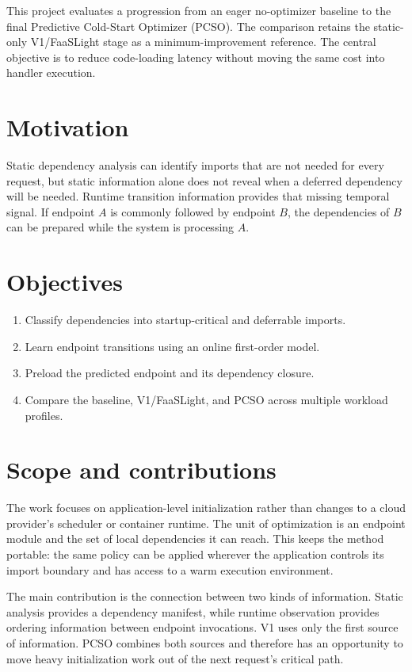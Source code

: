 \documentclass[12pt]{report}
\begin{document}
This project evaluates a progression from an eager no-optimizer baseline to the final Predictive Cold-Start Optimizer (PCSO). The comparison retains the static-only V1/FaaSLight stage as a minimum-improvement reference. The central objective is to reduce code-loading latency without moving the same cost into handler execution.

\section{Motivation}
Static dependency analysis can identify imports that are not needed for every request, but static information alone does not reveal when a deferred dependency will be needed. Runtime transition information provides that missing temporal signal. If endpoint $A$ is commonly followed by endpoint $B$, the dependencies of $B$ can be prepared while the system is processing $A$.

\section{Objectives}
\begin{enumerate}[label={(\arabic*)}]
\item Classify dependencies into startup-critical and deferrable imports.
\item Learn endpoint transitions using an online first-order model.
\item Preload the predicted endpoint and its dependency closure.
\item Compare the baseline, V1/FaaSLight, and PCSO across multiple workload profiles.
\end{enumerate}

\section{Scope and contributions}
The work focuses on application-level initialization rather than changes to a cloud provider's scheduler or container runtime. The unit of optimization is an endpoint module and the set of local dependencies it can reach. This keeps the method portable: the same policy can be applied wherever the application controls its import boundary and has access to a warm execution environment.

The main contribution is the connection between two kinds of information. Static analysis provides a dependency manifest, while runtime observation provides ordering information between endpoint invocations. V1 uses only the first source of information. PCSO combines both sources and therefore has an opportunity to move heavy initialization work out of the next request's critical path.
\end{document}
